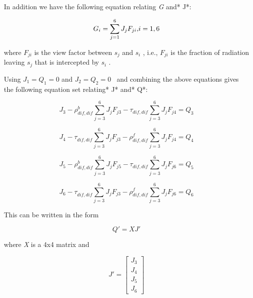 In addition we have the following equation relating \emph{G} and* J*:

\begin{equation}
{G_i} = \sum\limits_{j = 1}^6 {{J_j}{F_{ji}}{\rm{ ,    }}i = 1,6}
\end{equation}

where \({F_{ji}}\) is the view factor between \({s_j}\) and \({s_i}\) , i.e., \({F_{ji}}\) is the fraction of radiation leaving \({s_j}\) that is intercepted by \({s_i}\) .

Using \({J_1} = {Q_1} = 0\) and \({J_2} = {Q_2} = 0\) ~and combining the above equations gives the following equation set relating* J* and* Q*:

\begin{equation}
{J_3} - \rho_{dif,dif}^b\sum\limits_{j = 3}^6 {{J_j}{F_{j3}} - {\tau_{dif,dif}}\sum\limits_{j = 3}^6 {{J_j}{F_{j4}} = {Q_3}} }
\end{equation}

\begin{equation}
{J_4} - \tau_{dif,dif}^{}\sum\limits_{j = 3}^6 {{J_j}{F_{j3}} - \rho_{dif,dif}^f\sum\limits_{j = 3}^6 {{J_j}{F_{j4}} = {Q_4}} }
\end{equation}

\begin{equation}
{J_5} - \rho_{dif,dif}^b\sum\limits_{j = 3}^6 {{J_j}{F_{j5}} - {\tau_{dif,dif}}\sum\limits_{j = 3}^6 {{J_j}{F_{j6}} = {Q_5}} }
\end{equation}

\begin{equation}
{J_6} - \tau_{dif,dif}^{}\sum\limits_{j = 3}^6 {{J_j}{F_{j3}} - \rho_{dif,dif}^f\sum\limits_{j = 3}^6 {{J_j}{F_{j6}} = {Q_6}} }
\end{equation}

This can be written in the form

\begin{equation}
Q' = XJ'
\end{equation}

where \emph{X} is a 4x4 matrix and

\begin{equation}
J' = \left[ \begin{array}{c}
   J_3 \\
   J_4 \\
   J_5 \\
   J_6 \end{array} \right]
\end{equation}


